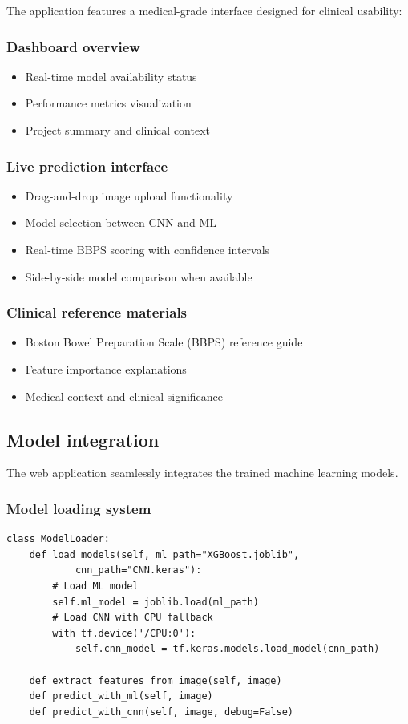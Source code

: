\documentclass[11pt]{article}
\begin{document}
The application features a medical-grade interface designed for clinical usability:

\subsubsection{Dashboard overview}
\begin{itemize}
    \item Real-time model availability status
    \item Performance metrics visualization
    \item Project summary and clinical context
\end{itemize}

\subsubsection{Live prediction interface}
\begin{itemize}
    \item Drag-and-drop image upload functionality
    \item Model selection between CNN and ML
    \item Real-time BBPS scoring with confidence intervals
    \item Side-by-side model comparison when available
\end{itemize}

\subsubsection{Clinical reference materials}
\begin{itemize}
    \item Boston Bowel Preparation Scale (BBPS) reference guide
    \item Feature importance explanations
    \item Medical context and clinical significance
\end{itemize}

\subsection{Model integration}

The web application seamlessly integrates the trained machine learning models.

\subsubsection{Model loading system}
\begin{verbatim}
class ModelLoader:
    def load_models(self, ml_path="XGBoost.joblib",
            cnn_path="CNN.keras"):
        # Load ML model
        self.ml_model = joblib.load(ml_path)
        # Load CNN with CPU fallback
        with tf.device('/CPU:0'):
            self.cnn_model = tf.keras.models.load_model(cnn_path)
    
    def extract_features_from_image(self, image)
    def predict_with_ml(self, image)
    def predict_with_cnn(self, image, debug=False)
\end{verbatim}
\end{document}
